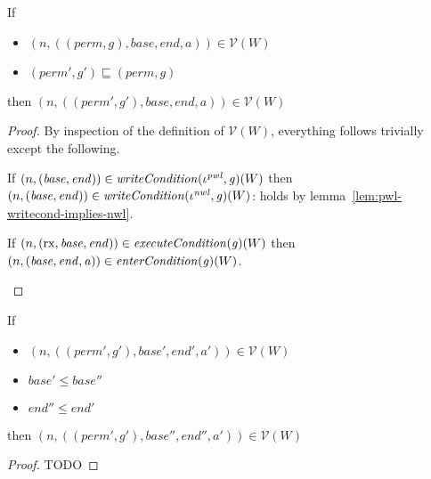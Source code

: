 \documentclass[a4paper]{article}
\newcommand{\var}[1]{\mathit{#1}}
\newcommand{\gl}{\var{g}}
\newcommand{\addr}{\var{a}}
\newcommand{\start}{\var{base}}
\newcommand{\addrend}{\var{end}}
\newcommand{\perm}{\var{perm}}
\newcommand{\nwl}{\var{nwl}}
\newcommand{\pwl}{\var{pwl}}
\newcommand{\plainfun}[2]{
  \ifthenelse{\equal{#2}{}}
  {\mathit{#1}}
  {\mathit{#1}(#2)}
}
\newcommand{\writeCond}[1]{\plainfun{writeCondition}{#1}}
\newcommand{\execCond}[1]{\plainfun{executeCondition}{#1}}
\newcommand{\entryCond}[1]{\plainfun{enterCondition}{#1}}
\newcommand{\asmType}{\plaindom{AsmType}}
\newcommand{\plaindom}[1]{\mathrm{#1}}
\newcommand{\intr}[2]{\mathcal{#1}}
\newcommand{\valueintr}[1]{\intr{V}{#1}}
\newcommand{\stdvr}{\valueintr{\asmType}}
\newcommand{\npair}[2][n]{\left(#1,#2 \right)}
\newcommand{\plainperm}[1]{\mathrm{#1}}
\newcommand{\exec}{\plainperm{rx}}
\begin{document}
 \begin{lemma}
   \label{lem:conds-restrict-suffice}
   If
   \begin{itemize}
   \item $\npair{((\perm,\gl),\start,\addrend,\addr)}\in\stdvr(W)$
   \item $(\perm',\gl')\sqsubseteq (\perm,\gl)$
   \end{itemize}
 
   then  $\npair{((\perm',\gl'),\start,\addrend,\addr)}\in \stdvr(W)$
 \end{lemma}
 \begin{proof}
   By inspection of the definition of $\stdvr(W)$, everything follows trivially
   except the following.

   \begin{enumproof}
   \item If $\npair{(\start,\addrend)} \in \writeCond{}(\iota^\pwl,\gl)(W)$ then
     $\npair{(\start,\addrend)} \in \writeCond{}(\iota^\nwl,\gl)(W)$: holds
     by lemma~\ref{lem:pwl-writecond-implies-nwl}.
   \item If $\npair{(\exec,\start,\addrend)} \in \execCond{}(\gl)(W)$ then
     $\npair{(\start,\addrend,\addr)} \in \entryCond{}(\gl)(W)$.
   \end{enumproof}
 \end{proof}
 
 \begin{lemma}
   \label{lem:conds-subseg-suffice}
   If
   \begin{itemize}
   \item $\npair{((\perm',\gl'),\start',\addrend',\addr')} \in \stdvr(W)$
   \item $\start' \leq \start''$
   \item $\addrend'' \leq \addrend'$
   \end{itemize}
 
   then $\npair{((\perm',\gl'),\start'',\addrend'',\addr')} \in \stdvr(W)$
 \end{lemma}
 \begin{proof}
   TODO
 \end{proof}
 
\end{document}
